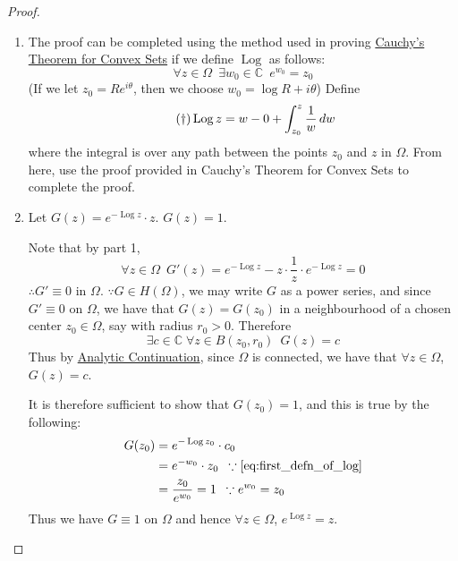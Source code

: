 \documentclass[notoc,notitlepage]{tufte-book}
\DeclareMathOperator{\Log}{Log}
\begin{document}
\begin{proof}
  \begin{enumerate}
    \item The proof can be completed using the method used in proving \hyperref[thm:cauchy_s_theorem_for_convex_set]{Cauchy's Theorem for Convex Sets} if we define $\Log$ as follows:
    \begin{equation*}
      \forall z \in \Omega \enspace \exists w_0 \in \mathbb{C} \enspace e^{w_0} = z_0
    \end{equation*}
    (If we let $z_0 = Re^{i \theta}$, then we choose $w_0 = \log R + i \theta$)
    Define
    \begin{equation}\tag{$\dagger$}\label{eq:first_defn_of_log}
      \Log z = w-0 + \int_{z_0}^{z} \frac{1}{w} \dif{w}
    \end{equation}
    where the integral is over any path between the points $z_0$ and $z$ in $\Omega$. From here, use the proof provided in Cauchy's Theorem for Convex Sets to complete the proof.
    
    \item Let $G(z) = e^{- \Log z} \cdot z$. \WTS $G(z) = 1$.

    Note that by part 1,
    \begin{equation*}
      \forall z \in \Omega \enspace G'(z) = e^{- \Log z} - z \cdot \frac{1}{z} \cdot e^{- \Log z} = 0
    \end{equation*}
    $\therefore G' \equiv 0$ in $\Omega$. $\because G \in H(\Omega)$, we may write $G$ as a power series, and since $G' \equiv 0$ on $\Omega$, we have that $G(z) = G(z_0)$ in a neighbourhood of a chosen center $z_0 \in \Omega$, say with radius $r_0 > 0$. Therefore
    \begin{equation*}
      \exists c \in \mathbb{C} \; \forall z \in B(z_0, r_0) \enspace G(z) = c
    \end{equation*}
    Thus by \hyperref[lemma:principle_of_analytic_continuation]{Analytic Continuation}, since $\Omega$ is connected, we have that $\forall z \in \Omega$, $G(z) = c$.

    It is therefore sufficient to show that $G(z_0) = 1$, and this is true by the following:
    \begin{align*}
      G(z_0) &= e^{- \Log z_0} \cdot c_0 \\
            &= e^{- w_0} \cdot z_0 \enspace \because \cref{eq:first_defn_of_log} \\
            &= \frac{z_0}{e^{w_0}} = 1 \enspace \because e^{w_0} = z_0 
    \end{align*}
    Thus we have $G \equiv 1$ on $\Omega$ and hence $\forall z \in \Omega$, $e^{\Log z} = z$.


\end{enumerate}
\end{proof}
\end{document}
